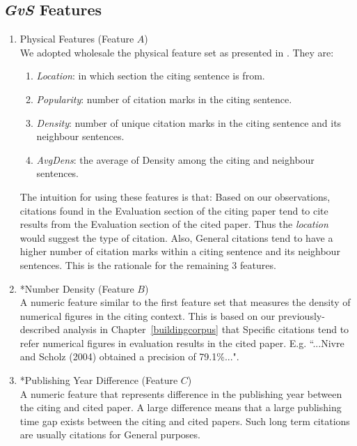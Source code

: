 \subsection*{{\it GvS} Features}
\begin{enumerate}
\item Physical Features (Feature $A$)\\
We adopted wholesale the physical feature set as presented in \cite{dongensemble}. They are:
\begin{enumerate}
\item \textit{Location}: in which section the citing sentence is from.
\item \textit{Popularity}: number of citation marks in the citing sentence.
\item \textit{Density}: number of unique citation marks in the citing sentence and its neighbour sentences.
\item \textit{AvgDens}: the average of Density among the citing and neighbour sentences.
\end{enumerate}

The intuition for using these features is that: Based on our observations, citations found in the Evaluation section of the citing paper tend to cite results from the Evaluation section of the cited paper. Thus the \textit{location} would suggest the type of citation. Also, General citations tend to have a higher number of citation marks within a citing sentence and its neighbour sentences. This is the rationale for the remaining 3 features.


\item *Number Density (Feature $B$)\\
A numeric feature similar to the first feature set that measures the density of numerical figures in the citing context. This is based on our previously-described analysis in Chapter~\ref{buildingcorpus} that Specific citations tend to refer numerical figures in evaluation results in the cited paper. E.g. ``...Nivre and Scholz (2004) obtained a precision of 79.1\%...".

\item *Publishing Year Difference (Feature $C$)\\
A numeric feature that represents difference in the publishing year between the citing and cited paper. A large difference means that a large publishing time gap exists between the citing and cited papers.  Such long term citations are usually citations for General purposes.


\end{enumerate}

